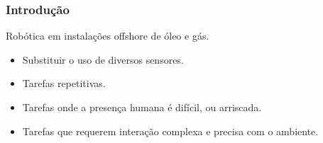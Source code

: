 \documentclass{beamer}
\begin{document}
\begin{frame}
\frametitle{Introdução}
Robótica em instalações offshore de óleo e gás.
\begin{itemize}
\item Substituir o uso de diversos sensores.
\item Tarefas repetitivas.
\item Tarefas onde a presença humana é difícil, ou arriscada.
\item Tarefas que requerem interação complexa e precisa com o ambiente.
\end{itemize}

\newlength{\twosubht}
\newsavebox{\twosubbox}

\begin{figure}[htp]
\sbox{}
\setlength{\twosubht}{\ht\twosubbox}
\centering
{}\quad
{}
\end{figure}
\end{frame}
\end{document}
